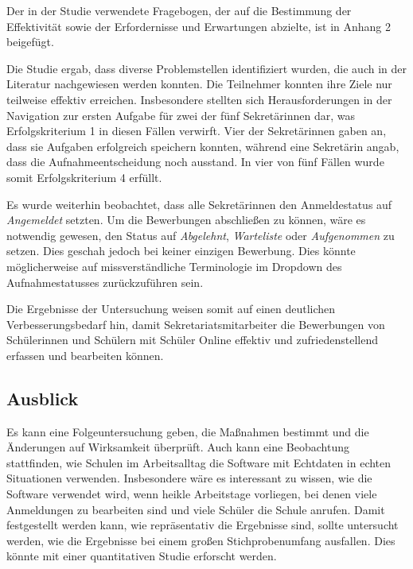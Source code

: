 Der in der Studie verwendete Fragebogen, der auf die Bestimmung der Effektivität sowie der Erfordernisse und Erwartungen abzielte, ist in Anhang 2 beigefügt.

Die Studie ergab, dass diverse Problemstellen identifiziert wurden, die auch in der Literatur nachgewiesen werden konnten. Die Teilnehmer konnten ihre Ziele nur teilweise effektiv erreichen. Insbesondere stellten sich Herausforderungen in der Navigation zur ersten Aufgabe für zwei der fünf Sekretärinnen dar, was Erfolgskriterium 1 in diesen Fällen verwirft. Vier der Sekretärinnen gaben an, dass sie Aufgaben erfolgreich speichern konnten, während eine Sekretärin angab, dass die Aufnahmeentscheidung noch ausstand. In vier von fünf Fällen wurde somit Erfolgskriterium 4 erfüllt.

Es wurde weiterhin beobachtet, dass alle Sekretärinnen den Anmeldestatus auf \textit{Angemeldet} setzten. Um die Bewerbungen abschließen zu können, wäre es notwendig gewesen, den Status auf \textit{Abgelehnt}, \textit{Warteliste} oder \textit{Aufgenommen} zu setzen. Dies geschah jedoch bei keiner einzigen Bewerbung. Dies könnte möglicherweise auf missverständliche Terminologie im Dropdown des Aufnahmestatusses zurückzuführen sein.

Die Ergebnisse der Untersuchung weisen somit auf einen deutlichen Verbesserungsbedarf hin, damit Sekretariatsmitarbeiter die Bewerbungen von Schülerinnen und Schülern mit Schüler Online effektiv und zufriedenstellend erfassen und bearbeiten können.

\subsection{Ausblick}
Es kann eine Folgeuntersuchung geben, die Maßnahmen bestimmt und die Änderungen auf Wirksamkeit überprüft.
Auch kann eine Beobachtung stattfinden, wie Schulen im Arbeitsalltag die Software mit Echtdaten in echten Situationen verwenden. Insbesondere wäre es interessant zu wissen, wie die Software verwendet wird, wenn heikle Arbeitstage vorliegen, bei denen viele Anmeldungen zu bearbeiten sind und viele Schüler die Schule anrufen.
Damit festgestellt werden kann, wie repräsentativ die Ergebnisse sind, sollte untersucht werden, wie die Ergebnisse bei einem großen Stichprobenumfang ausfallen. Dies könnte mit einer quantitativen Studie erforscht werden.
